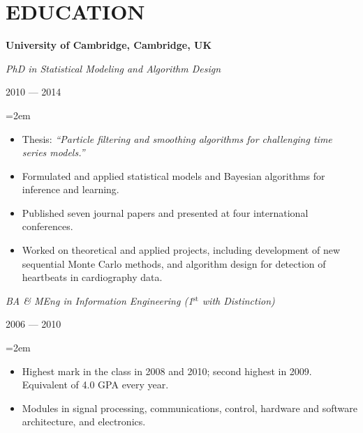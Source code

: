 \documentclass[letterpaper,10pt]{article}
\newcommand{\sepspace}{\vspace*{0.3em}}
\newcommand{\NewPart}[1]{\vspace{-1em} \section*{\uppercase{#1}}}
\newcommand{\MainHeading}[1]{\noindent\textbf{#1}}
\newcommand{\SubHeading}[1]{\noindent\textit{#1}}
\newcommand{\DateBox}[1]{\colorbox{light-gray}{\parbox{8em}{\hfill\color{White}#1}}}
\newcommand{\Details}[1]{\hangindent=2em\hangafter=0\small#1\normalsize\par}
\newcommand{\WorkEntry}[4]{%
                \MainHeading{#1} \hfill \DateBox{#2} \par
                \SubHeading{#3} \par
                \noindent \hangindent=2em \hangafter=0 \Details{#4} }
\newcommand{\EducationEntry}[3]{%
                \SubHeading{#1} \hfill \DateBox{#2} \par
                \Details{#3} }
\begin{document}








\NewPart{Education}

\MainHeading{University of Cambridge, Cambridge, UK}

\EducationEntry{PhD in Statistical Modeling and Algorithm Design}{2010 --- 2014}{
\begin{itemize}
 \item Thesis: \textit{``Particle filtering and smoothing algorithms for challenging time series models.''}
 \item Formulated and applied statistical models and Bayesian algorithms for inference and learning.
 \item Published seven journal papers and presented at four international conferences.
 \item Worked on theoretical and applied projects, including development of new sequential Monte Carlo methods, and algorithm design for detection of heartbeats in cardiography data.
\end{itemize}
}
\sepspace

\EducationEntry{BA \& MEng in Information Engineering (1$^{\text{st}}$ with Distinction)}{2006 --- 2010}{
\begin{itemize}
  \item Highest mark in the class in 2008 and 2010; second highest in 2009. Equivalent of 4.0 GPA every year.
  \item Modules in signal processing, communications, control, hardware and software architecture, and electronics.
\end{itemize}
}
\end{document}
